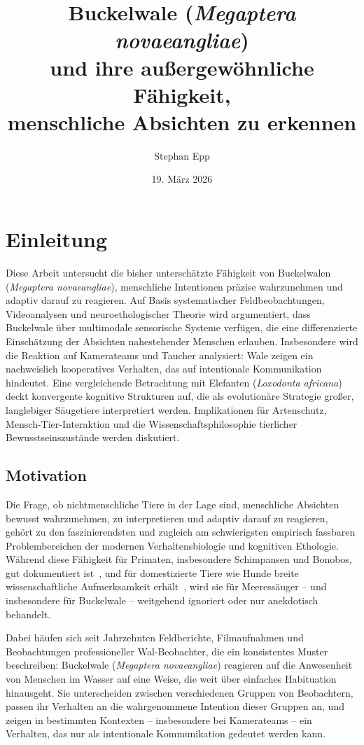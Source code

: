 ﻿\documentclass[12pt,a4paper]{article}
\title{Buckelwale (\textit{Megaptera novaeangliae})\\
	und ihre außergewöhnliche Fähigkeit,\\
	menschliche Absichten zu erkennen}
\author{Stephan Epp}
\date{19. März 2026}
\theoremstyle{definition}
\theoremstyle{remark}
\begin{document}
\maketitle
\tableofcontents
\newpage

\section{Einleitung}

Diese Arbeit untersucht die bisher unterschätzte Fähigkeit von Buckelwalen
(\textit{Megaptera novaeangliae}), menschliche Intentionen präzise wahrzunehmen
und adaptiv darauf zu reagieren. Auf Basis systematischer Feldbeobachtungen,
Videoanalysen und neuroethologischer Theorie wird argumentiert, dass Buckelwale
über multimodale sensorische Systeme verfügen, die eine differenzierte
Einschätzung der Absichten nahestehender Menschen erlauben. Insbesondere wird
die Reaktion auf Kamerateams und Taucher analysiert: Wale zeigen ein
nachweislich kooperatives Verhalten, das auf intentionale Kommunikation
hindeutet. Eine vergleichende Betrachtung mit Elefanten (\textit{Loxodonta africana})
deckt konvergente kognitive Strukturen auf, die als evolutionäre Strategie
großer, langlebiger Säugetiere interpretiert werden. Implikationen für
Artenschutz, Mensch-Tier-Interaktion und die Wissenschaftsphilosophie
tierlicher Bewusstseinszustände werden diskutiert.

\subsection{Motivation}

Die Frage, ob nichtmenschliche Tiere in der Lage sind, menschliche Absichten
bewusst wahrzunehmen, zu interpretieren und adaptiv darauf zu reagieren, gehört
zu den faszinierendsten und zugleich am schwierigsten empirisch fassbaren
Problembereichen der modernen Verhaltensbiologie und kognitiven Ethologie.
Während diese Fähigkeit für Primaten, insbesondere Schimpansen und Bonobos,
gut dokumentiert ist~\cite{call2003chimpanzees}, und für domestizierte Tiere
wie Hunde breite wissenschaftliche Aufmerksamkeit erhält~\cite{miklosi2004dogs},
wird sie für Meeressäuger -- und insbesondere für Buckelwale -- weitgehend
ignoriert oder nur anekdotisch behandelt.

Dabei häufen sich seit Jahrzehnten Feldberichte, Filmaufnahmen und Beobachtungen
professioneller Wal-Beobachter, die ein konsistentes Muster beschreiben:
Buckelwale (\textit{Megaptera novaeangliae}) reagieren auf die Anwesenheit von
Menschen im Wasser auf eine Weise, die weit über einfaches Habituation hinausgeht.
Sie unterscheiden zwischen verschiedenen Gruppen von Beobachtern, passen ihr
Verhalten an die wahrgenommene Intention dieser Gruppen an, und zeigen in
bestimmten Kontexten -- insbesondere bei Kamerateams -- ein Verhalten, das nur
als intentionale Kommunikation gedeutet werden kann.
\end{document}
